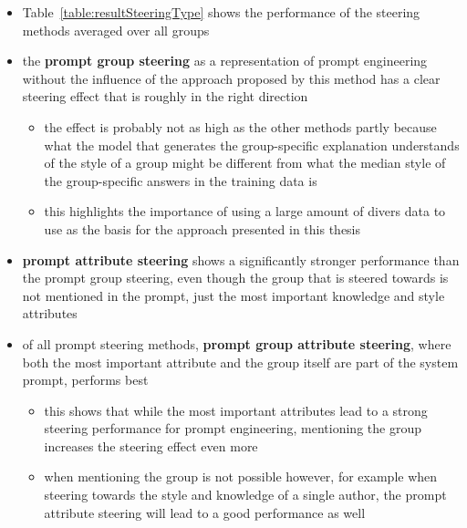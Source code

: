 \begin{itemize}
  \item Table~\ref{table:resultSteeringType} shows the performance of the steering methods averaged over all groups
  \item the \textbf{prompt group steering} as a representation of prompt engineering without the influence of the approach proposed by this method has a clear steering effect that is roughly in the right direction
        \begin{itemize}
          \item the effect is probably not as high as the other methods partly because what the model that generates the group-specific explanation understands of the style of a group might be different from what the median style of the group-specific answers in the training data is
          \item this highlights the importance of using a large amount of divers data to use as the basis for the approach presented in this thesis
        \end{itemize}
  \item \textbf{prompt attribute steering} shows a significantly stronger performance than the prompt group steering, even though the group that is steered towards is not mentioned in the prompt, just the most important knowledge and style attributes
  \item of all prompt steering methods, \textbf{prompt group attribute steering}, where both the most important attribute and the group itself are part of the system prompt, performs best
        \begin{itemize}
          \item this shows that while the most important attributes lead to a strong steering performance for prompt engineering, mentioning the group increases the steering effect even more
          \item when mentioning the group is not possible however, for example when steering towards the style and knowledge of a single author, the prompt attribute steering will lead to a good performance as well
        \end{itemize}


\end{itemize}
